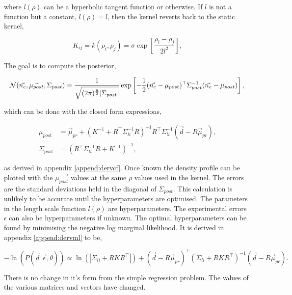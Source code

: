 \noindent where $l(\rho)$ can be a hyperbolic tangent function or otherwise. If $l$ is not a function but a constant, $l(\rho) = l$, then the kernel reverts back to the static kernel,

\begin{equation}
K_{ij} = k(\rho_i, \rho_j) = \sigma \exp\left[{\frac{\rho_i - \rho_j}{2l^2}}\right],
\end{equation}
  
\noindent The goal is to compute the posterior,

\begin{equation}
\mathcal{N}(\vec{n_e}, \vec{\mu_{post}}, \Sigma_{post}) = \frac{1}{\sqrt{(2\pi)^{\frac{n}{2}}|\Sigma_{post}|}} \exp \left[{{-\frac{1}{2}(\vec{n_e}-\mu_{post})^\top\Sigma_{post}^{-1}(\vec{n_e}-\mu_{post})}}\right],\\
\end{equation}

\noindent which can be done with the closed form expressions,

$$
\begin{aligned}
\mu_{post} &= \vec{\mu}_{pr} + (K^{-1} + R^{\top} \Sigma_{li}^{-1} R)^{-1} R^{\top} \Sigma_{li}^{-1} (\vec{d} - R \vec{\mu}_{pr}),\\
\Sigma_{post} &= \left(R^\top \Sigma_{li}^{-1} R + K^{-1}\right)^{-1},
\end{aligned}
$$

\noindent as derived in appendix \ref{append:dervcf}. Once known the density profile can be plotted with the $\vec{\mu_{post}}$ values at the same $\rho$ values used in the kernel. The errors are the standard deviations held in the diagonal of $\Sigma_{post}$. This calculation is unlikely to be accurate until the hyperparameters are optimised. The parameters in the length scale function $l(\rho)$ are hyperparameters. The experimental errors $\epsilon$ can also be hyperparameters if unknown. The optimal hyperparameters can be found by minimising the negative log marginal likelihood. It is derived in appendix \ref{append:dervml} to be, 

\begin{equation}
-\ln(P(\vec d| \vec \epsilon,\theta)) \propto \ln(|\Sigma_{li}+RKR^\top|) + (\vec{d} - R\vec{\mu}_{pr})^{\top} (\Sigma_{li} + R K R^{\top})^{-1} (\vec{d} - R\vec{\mu}_{pr}).
\end{equation}

\noindent There is no change in it's form from the simple regression problem. The values of the various matrices and vectors have changed. 

